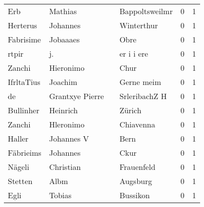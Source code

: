 \begin{tabular}{llllrr}
                      Erb &                            Mathias &             &                              Bappoltsweilmr &          0 &         1 \\
                 Herterus &                           Johannes &             &                                  Winterthur &          0 &         1 \\
                Fabrisime &                           Jobaaaes &             &                                        Obre &          0 &         1 \\
                    rtpir &                                 j. &             &                                  er i i ere &          0 &         1 \\
                   Zanchi &                          Hieronimo &             &                                        Chur &          0 &         1 \\
               IfrltaTius &                            Joachim &             &                                  Gerne meim &          0 &         1 \\
                       de &                    Grantxye Pierre &             &                               SrleribachZ H &          0 &         1 \\
                Bullinher &                           Heinrich &             &                                      Zürich &          0 &         1 \\
                   Zanchi &                          Hleronimo &             &                                   Chiavenna &          0 &         1 \\
                   Haller &                         Johannes V &             &                                        Bern &          0 &         1 \\
                Fäbrieims &                           Johannes &             &                                        Ckur &          0 &         1 \\
                   Nägeli &                          Christian &             &                                  Frauenfeld &          0 &         1 \\
                  Stetten &                               Albm &             &                                    Augsburg &          0 &         1 \\
                     Egli &                             Tobias &             &                                    Bussikon &          0 &         1 \\

\end{tabular}
